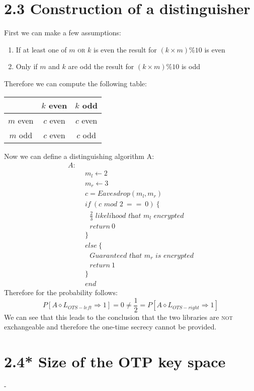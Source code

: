 \documentclass{report}
\begin{document}
	\section*{2.3 Construction of a distinguisher}
	First we can make a few assumptions:
	\begin{enumerate}[\hspace{1cm} 1.]
		\item If at least one of $m$ \textsc{or} $k$ is even the result for $(k \times m) \% 10$ is even
		\item Only if $m$ and $k$ are odd the result for $(k \times m) \% 10$ is odd
	\end{enumerate}
	Therefore we can compute the following table: \\
	\begin{center}	
		\begin{tabular}{ccc}
			\hline
	    			 & $k$ even & $k$ odd \\
			\hline
			$m$ even & $c$ even & $c$ even \\
			$m$ odd  & $c$ even & $c$ odd \\
			\hline
		\end{tabular}
	\end{center}
	Now we can define a distinguishing algorithm A:
	\begin{align*}
		A: \ & \\
		& \ m_l \leftarrow 2 \\
		& \ m_r \leftarrow 3 \\
		& \ c = Eavesdrop(m_l, m_r) \\
		& \ if \ (c \textit{ mod } 2 \ == \ 0) \ \{ \\
		& \ \ \ \ \frac{2}{3} \textit{ likelihood that } m_l \textit{ encrypted} \\
		& \ \ \ \ return \ 0 \\
		& \ \} \\
		& \ else \ \{ \\
		& \ \ \ \ \textit{Guaranteed that } m_r \textit{ is encrypted} \\
		& \ \ \ \ return \ 1 \\
		& \ \} \\
		& \ end
	\end{align*}
	Therefore for the probability follows:
	\[
		P[A \diamond L_{OTS-left} \Rightarrow 1] = 0 \neq \frac{1}{2} = P[A \diamond L_{OTS-right} \Rightarrow 1]
	\]
	We can see that this leads to the conclusion that the two libraries are \textsc{not} exchangeable and therefore the one-time secrecy cannot be provided.
	\hfill \\
	
	\section*{2.4* Size of the OTP key space}
	-
	
\end{document}
